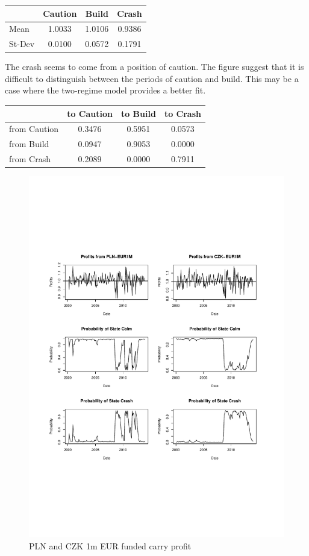 \documentclass[12pt, a4paper, oneside]{article} %
\begin{document}
\begin{centering}
 \begin{tabular}{l c c c}
 & Caution & Build & Crash \\
 \hline
 Mean & 1.0033 & 1.0106 & 0.9386\\
 St-Dev & 0.0100 & 0.0572 & 0.1791\\
 \end{tabular}
 \end{centering}

The crash seems to come from a position of caution.  The figure suggest that it is difficult to distinguish between the periods of caution and build.  This may be a case where the two-regime model provides a better fit. 

 \begin{centering}
 \begin{tabular}{l c c c}
 & to Caution & to Build & to Crash\\
 \hline
 from Caution & 0.3476 & 0.5951 & 0.0573\\
 from Build & 0.0947 & 0.9053 & 0.0000\\
 from Crash & 0.2089 & 0.0000 & 0.7911
 \end{tabular}
 \end{centering}
 
 
 
\begin{figure}[h!]
\centering
\caption{PLN and CZK 1m EUR funded carry profit}
\includegraphics[scale = .75]{../Figures/2RegProb/PLNCZKEUR.pdf}
\end{figure}
\end{document}
